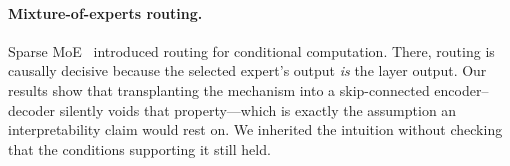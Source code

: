 \paragraph{Mixture-of-experts routing.}
Sparse MoE~\cite{shazeer2017moe,fedus2022switch,riquelme2021vmoe} introduced routing for
conditional computation. There, routing is causally decisive because the selected expert's output
\emph{is} the layer output. Our results show that transplanting the mechanism into a
skip-connected encoder--decoder silently voids that property---which is exactly the assumption an
interpretability claim would rest on. We inherited the intuition without checking that the
conditions supporting it still held.
